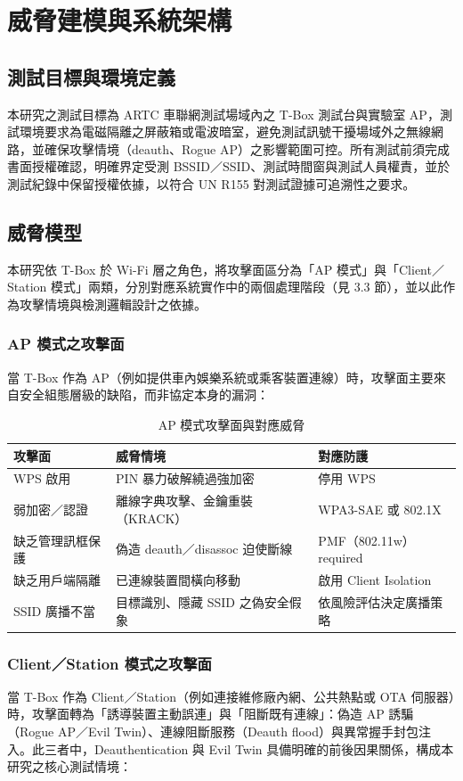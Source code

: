 \documentclass[12pt,a4paper,oneside]{report}
\begin{document}
\chapter{威脅建模與系統架構}

\section{測試目標與環境定義}
本研究之測試目標為 ARTC 車聯網測試場域內之 T-Box 測試台與實驗室 AP，測試環境要求為電磁隔離之屏蔽箱或電波暗室，避免測試訊號干擾場域外之無線網路，並確保攻擊情境（deauth、Rogue AP）之影響範圍可控。所有測試前須完成書面授權確認，明確界定受測 BSSID／SSID、測試時間窗與測試人員權責，並於測試紀錄中保留授權依據，以符合 UN R155 對測試證據可追溯性之要求。

\section{威脅模型}
本研究依 T-Box 於 Wi-Fi 層之角色，將攻擊面區分為「AP 模式」與「Client／Station 模式」兩類，分別對應系統實作中的兩個處理階段（見 3.3 節），並以此作為攻擊情境與檢測邏輯設計之依據。

\subsection{AP 模式之攻擊面}
當 T-Box 作為 AP（例如提供車內娛樂系統或乘客裝置連線）時，攻擊面主要來自安全組態層級的缺陷，而非協定本身的漏洞：

\begin{table}[htbp]
\centering
\caption{AP 模式攻擊面與對應威脅}
\label{tab:threat-ap}
\begin{tabular}{p{}p{}p{}}
\toprule
攻擊面 & 威脅情境 & 對應防護 \\
\midrule
WPS 啟用 & PIN 暴力破解繞過強加密 & 停用 WPS \\
弱加密／認證 & 離線字典攻擊、金鑰重裝（KRACK） & WPA3-SAE 或 802.1X \\
缺乏管理訊框保護 & 偽造 deauth／disassoc 迫使斷線 & PMF（802.11w）required \\
缺乏用戶端隔離 & 已連線裝置間橫向移動 & 啟用 Client Isolation \\
SSID 廣播不當 & 目標識別、隱藏 SSID 之偽安全假象 & 依風險評估決定廣播策略 \\
\bottomrule
\end{tabular}
\end{table}

\subsection{Client／Station 模式之攻擊面}
當 T-Box 作為 Client／Station（例如連接維修廠內網、公共熱點或 OTA 伺服器）時，攻擊面轉為「誘導裝置主動誤連」與「阻斷既有連線」：偽造 AP 誘騙（Rogue AP／Evil Twin）、連線阻斷服務（Deauth flood）與異常握手封包注入。此三者中，Deauthentication 與 Evil Twin 具備明確的前後因果關係，構成本研究之核心測試情境：
\end{document}
